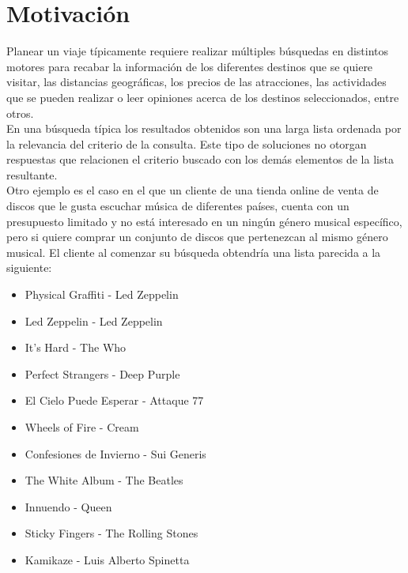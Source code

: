 \section{Motivación}
Planear un viaje típicamente requiere realizar múltiples búsquedas en distintos motores para recabar la información de los diferentes destinos que se quiere visitar, las distancias geográficas, los precios de las atracciones, las actividades que se pueden realizar o leer opiniones acerca de los destinos seleccionados, entre otros.\\
En una búsqueda típica los resultados obtenidos son una larga lista ordenada por la relevancia del criterio de la consulta. Este tipo de soluciones no otorgan respuestas que relacionen el criterio buscado con los demás elementos de la lista resultante.\\
Otro ejemplo es el caso en el que un cliente de una tienda online de venta de discos que le gusta escuchar música de diferentes países, cuenta con un presupuesto limitado y no está interesado en un ningún género musical específico, pero si quiere comprar un conjunto de discos que pertenezcan al mismo género musical. El cliente al comenzar su búsqueda obtendría una lista parecida a la siguiente:
\begin{itemize}
  \item Physical Graffiti - Led Zeppelin
  \item Led Zeppelin - Led Zeppelin
  \item It's Hard - The Who
  \item Perfect Strangers - Deep Purple
  \item El Cielo Puede Esperar - Attaque 77
  \item Wheels of Fire - Cream
  \item Confesiones de Invierno - Sui Generis
  \item The White Album - The Beatles
  \item Innuendo - Queen
  \item Sticky Fingers - The Rolling Stones
  \item Kamikaze - Luis Alberto Spinetta
\end{itemize}

